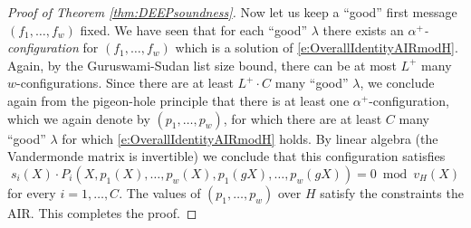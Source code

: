 \documentclass[11pt,article,oneside]{memoir}
\theoremstyle{definition}
\theoremstyle{remark}
\begin{document}
\begin{proof}[Proof of Theorem \ref{thm:DEEPsoundness}]
Now let us keep a ``good'' first message $(f_1,\ldots, f_w)$ fixed.
We have seen that for each ``good'' $\lambda$ there exists an \textit{$\alpha^+$-configuration} for $(f_1,\ldots, f_w)$ which  is a solution of \eqref{e:OverallIdentityAIRmodH}.
Again, by the Guruswami-Sudan list size bound, there can be at most $L^+$ many $w$-configurations.
Since there are at least $L^+\cdot C$ many ``good'' $\lambda$, we conclude again from the pigeon-hole principle that there is at least one $\alpha^+$-configuration, which we again denote by $(p_1,\ldots, p_w)$, for which there are at least $C$ many “good” $\lambda$ for which \eqref{e:OverallIdentityAIRmodH} holds.
By linear algebra (the Vandermonde matrix is invertible) we conclude that this configuration  satisfies
\[
s_i(X)\cdot P_i(X, p_1(X), \ldots, p_w(X), p_1(gX), \ldots, p_w(g X)) = 0 \bmod v_H(X)
\]
for every $i =1, \ldots, C$.
The values of $(p_1,\ldots, p_w)$ over $H$ satisfy the constraints the AIR.
This completes the proof.
%
%

\end{proof}
\end{document}
